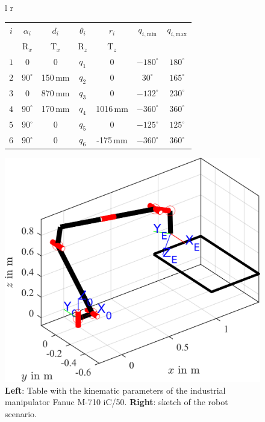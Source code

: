 \documentclass[robotics,article,accept,moreauthors,pdftex]{Definitions/mdpi}
\begin{document}
\begin{figure}[tb]
\begin{tabular}[t]{l r}
		\begin{tabular}[t]{|c|c|c|c|c|c|c|}
			\hline
			$i$ & $\alpha_i$ & $d_i$ & $\theta_i$ & $r_i$ & $q_{i,\mathrm{min}}$ & $q_{i,\mathrm{max}}$ \\
			& $\mathrm{R}_x$ & $\mathrm{T}_x$ & $\mathrm{R}_z$ & $\mathrm{T}_z$ & & \\
			\hline
			$1$ & $0$ & $0$ & $q_1$ & $0$ & $-180^\circ$ & $180^\circ$ \\
			$2$ & $90^\circ$ & 150\,mm & $q_2$ & $0$ & $30^\circ$ & $165^\circ$ \\
			$3$ & $0$ & 870\,mm & $q_3$ & $0$ & $-132^\circ$ & $230^\circ$ \\
			$4$ & $90^\circ$ & 170\,mm & $q_4$ & 1016\,mm & $-360^\circ$ & $360^\circ$ \\
			$5$ & $90^\circ$ & $0$ & $q_5$ & $0$ & $-125^\circ$ & $125^\circ$ \\
			$6$ & $90^\circ$ & $0$ & $q_6$ & -175\,mm & $-360^\circ$ & $360^\circ$ \\
			\hline
		\end{tabular}
    \begin{minipage}[t]{7.5cm}
    	\vspace{0.001cm} %
    	\hspace{1cm}
		\includegraphics[trim=30 30 0 30, clip, scale=0.7]{serrob_traj_zero_pose.png} %
    \end{minipage}
\end{tabular}
\caption{\textbf{Left}: Table with the kinematic parameters of the industrial manipulator Fanuc M-710 iC/50. \textbf{Right}: sketch of the robot scenario.}
\label{tab:mdh_industrialrobot}
\end{figure}
\end{document}
